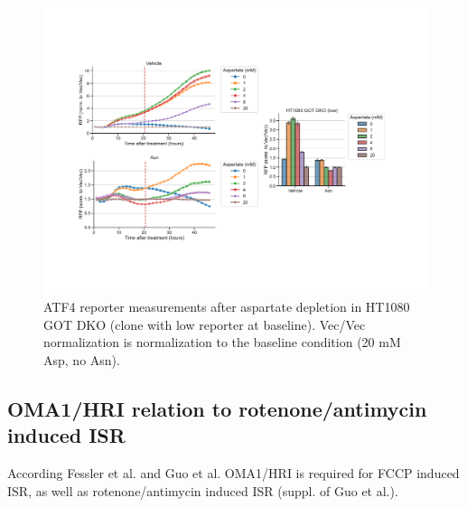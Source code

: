 \begin{figure}
    \centering
    \includegraphics[height=0.85\textheight]{figures/sapp/ISR/HT1080_DKO_ASPtit_time.pdf}
    \caption[Asp depl. induced ISR, HT1080 ATF4 reporter]{
    ATF4 reporter measurements after aspartate depletion in HT1080 GOT DKO (clone with low reporter at baseline).
    Vec/Vec normalization is normalization to the baseline condition (20 mM Asp, no Asn).
    }
    \label{fig:sapp:ISR:HT1080_DKO_ASPtit_time}
\end{figure}









\subsection{OMA1/HRI relation to rotenone/antimycin induced ISR}
According Fessler et al. and Guo et al. \cite{Fessler2020-zk, Guo2020-ia} OMA1/HRI is required for FCCP induced ISR, as well as rotenone/antimycin induced ISR (suppl. of Guo et al.).

